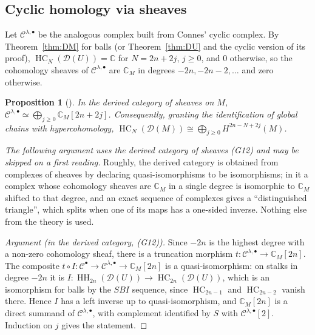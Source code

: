 \documentclass[11pt,oneside,reqno]{article}
\DeclareMathOperator{\HH}{HH}
\DeclareMathOperator{\HC}{HC}
\newcommand{\C}{\mathbb C}
\newcommand{\cD}{\mathcal D}
\theoremstyle{plain}
\newtheorem{proposition}[theorem]{Proposition}
\theoremstyle{definition}
\theoremstyle{remark}
\begin{document}
\subsection{Cyclic homology via sheaves}\label{subsec:cycsheaf}
Let \(\mathcal C^{\lambda,\bullet}\) be the analogous complex built from Connes' cyclic complex. By
Theorem~\ref{thm:DM} for balls (or Theorem~\ref{thm:DU} and the cyclic version of its
proof), \(\HC_N(\cD(U))=\C\) for \(N=2n+2j\), \(j\ge0\), and \(0\) otherwise, so the cohomology sheaves
of \(\mathcal C^{\lambda,\bullet}\) are \(\C_M\) in degrees \(-2n,-2n-2,\dots\) and zero otherwise.

\begin{proposition}[{\cite[\S5]{BG}}]\label{prop:cycsheaf}
In the derived category of sheaves on \(M\),
\(\mathcal C^{\lambda,\bullet}\simeq\bigoplus_{j\ge0}\C_M[2n+2j]\). Consequently, granting the identification of
global chains with hypercohomology, \(\HC_N(\cD(M))\cong\bigoplus_{j\ge0}H^{2n-N+2j}(M)\).
\end{proposition}

\emph{The following argument uses the derived category of sheaves (G12) and may be
skipped on a first reading.} Roughly, the derived category is obtained from
complexes of sheaves by declaring quasi-isomorphisms to be isomorphisms; in it a
complex whose cohomology sheaves are \(\C_M\) in a single degree is isomorphic to
\(\C_M\) shifted to that degree, and an exact sequence of complexes gives a
``distinguished triangle'', which splits when one of its maps has a one-sided
inverse. Nothing else from the theory is used.

\begin{proof}[Argument (in the derived category, (G12))]
Since \(-2n\) is the highest degree with a non-zero cohomology sheaf, there is a
truncation morphism \(t:\mathcal C^{\lambda,\bullet}\to\C_M[2n]\). The composite
\(t\circ I:\mathcal C^\bullet\to\mathcal C^{\lambda,\bullet}\to\C_M[2n]\) is a quasi-isomorphism: on stalks in degree
\(-2n\) it is \(I:\HH_{2n}(\cD(U))\to\HC_{2n}(\cD(U))\), which is an isomorphism for balls by the
\(SBI\) sequence, since \(\HC_{2n-1}\) and \(\HC_{2n-2}\) vanish there. Hence \(I\) has a left
inverse up to quasi-isomorphism, and \(\C_M[2n]\) is a direct summand of
\(\mathcal C^{\lambda,\bullet}\), with complement identified by \(S\) with \(\mathcal C^{\lambda,\bullet}[2]\). Induction on \(j\)
gives the statement.
\end{proof}
\end{document}
